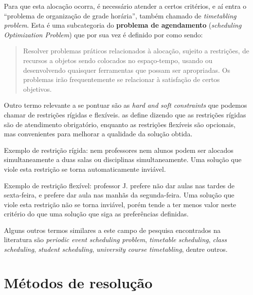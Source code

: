 Para que esta alocação ocorra, é necessário atender a certos critérios, e aí entra o ``problema de organização de grade horária'', também chamado de \textit{timetabling problem}. Esta é uma subcategoria do \textbf{problema de agendamento} (\textit{scheduling Optimization Problem}) \cite{Alencar2019} que por sua vez é definido por  como sendo:

\begin{quote}\footnotesize
  Resolver problemas práticos relacionados à alocação, sujeito a restrições, de recursos a objetos sendo colocados no espaço-tempo, usando ou desenvolvendo quaisquer ferramentas que possam ser apropriadas. Os problemas irão frequentemente se relacionar à satisfação de certos objetivos.
\end{quote}

Outro termo relevante a se pontuar são as \textit{hard and soft constraints} que podemos chamar de restrições rígidas e flexíveis.  as define dizendo que as restrições rígidas são de atendimento obrigatório, enquanto as restrições flexíveis são opcionais, mas convenientes para melhorar a qualidade da solução obtida.

Exemplo de restrição rígida: nem professores nem alunos podem ser alocados simultaneamente a duas salas ou disciplinas simultaneamente. Uma solução que viole esta restrição se torna automaticamente inviável.

Exemplo de restrição flexível: professor J. prefere não dar aulas nas tardes de sexta-feira, e prefere dar aula nas manhãs da segunda-feira. Uma solução que viole esta restrição não se torna inviável, porém tende a ter menos valor neste critério do que uma solução que siga as preferências definidas.

Alguns outros termos similares a este campo de pesquisa encontrados na literatura são \textit{periodic event scheduling problem}, \textit{timetable scheduling}, \textit{class scheduling}, \textit{student scheduling}, \textit{university course timetabling}, dentre outros.

\section{Métodos de resolução} \label{sec:resolucao}          %

